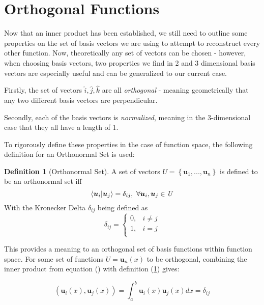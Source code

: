 \documentclass{article}
\newcommand{\B}[1]{\boldsymbol{#1}}
\theoremstyle{definition}
\newtheorem{definition}{Definition}[section]
\theoremstyle{remark}
\begin{document}
\section{Orthogonal Functions}

Now that an inner product has been established, we still need to 
outline some properties on the set of basis vectors we are using
to attempt to reconstruct every other function. Now, theoretically 
any set of vectors can be chosen - however, when choosing 
basis vectors, two properties we find in 2 and 3 dimensional 
basis vectors are especially useful and can be generalized 
to our current case.

Firstly, the set of vectors $\hat{i}, \hat{j}, \hat{k}$ are all \textit{orthogonal} - 
meaning geometrically that any two different basis vectors are perpendicular.

Secondly, each of the basis vectors is \textit{normalized}, meaning 
in the 3-dimensional case that they all have a length of 1.

To rigorously define these properties in the case of function space,
the following definition for an Orthonormal Set is used:


\begin{definition}[Orthonormal Set]
  A set of vectors $\mathit{U} = \left\{ \B{u}_1, ... , \B{u}_n \right\}$ is defined
  to be an orthonormal set iff
  \begin{equation}
    \braket{\B{u}_i| \B{u}_j} = \delta_{ij}, ~ \forall \B{u}_i, \B{u}_j \in  \mathit{U}
  \end{equation}
  With the Kronecker Delta $\delta_{ij}$ being defined as 
  \begin{equation}
    \delta_{ij} = 
    \begin{cases}
      0,  & i \neq j \\
      1, & i = j \\
    \end{cases}
  \end{equation}
  \label{def:OrthagonalSet}
\end{definition}

This provides a meaning to an orthogonal set of basis functions within function space.
For some set of functions $\mathit{U} = {\B{u}_n(x)}$ to be orthogonal,
combining the inner product from equation () with definition (\ref{def:OrthagonalSet})
gives:

\begin{equation}
  (\B{u}_i(x), \B{u}_j(x)) = \int_a^b \B{u}_i(x) \B{u}_j(x) dx  = \delta_{ij}
\end{equation}
\end{document}
